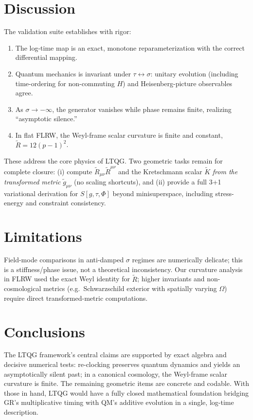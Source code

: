 \documentclass[11pt]{article}
\begin{document}
\section{Discussion}
The validation suite establishes with rigor:
\begin{enumerate}[leftmargin=1.25em]
\item The log-time map is an exact, monotone reparameterization with the correct differential mapping.
\item Quantum mechanics is invariant under $\tau\leftrightarrow\sigma$: unitary evolution (including time-ordering for non-commuting $H$) and Heisenberg-picture observables agree.
\item As $\sigma\to-\infty$, the generator vanishes while phase remains finite, realizing ``asymptotic silence.''
\item In flat FLRW, the Weyl-frame scalar curvature is finite and constant, $\tilde R=12(p-1)^2$.
\end{enumerate}
These address the core physics of LTQG. Two geometric tasks remain for complete closure:
(i) compute $\tilde R_{\mu\nu}\tilde R^{\mu\nu}$ and the Kretschmann scalar $\tilde K$ \emph{from the transformed metric} $\tilde g_{\mu\nu}$ (no scaling shortcuts), and
(ii) provide a full 3+1 variational derivation for $S[g,\tau,\Phi]$ beyond minisuperspace, including stress-energy and constraint consistency.

\section{Limitations}
Field-mode comparisons in anti-damped $\sigma$ regimes are numerically delicate; this is a stiffness/phase issue, not a theoretical inconsistency. Our curvature analysis in FLRW used the exact Weyl identity for $\tilde R$; higher invariants and non-cosmological metrics (e.g.\ Schwarzschild exterior with spatially varying $\Omega$) require direct transformed-metric computations.

\section{Conclusions}
The LTQG framework's central claims are supported by exact algebra and decisive numerical tests: re-clocking preserves quantum dynamics and yields an asymptotically silent past; in a canonical cosmology, the Weyl-frame scalar curvature is finite. The remaining geometric items are concrete and codable. With those in hand, LTQG would have a fully closed mathematical foundation bridging GR's multiplicative timing with QM's additive evolution in a single, log-time description.
\end{document}
